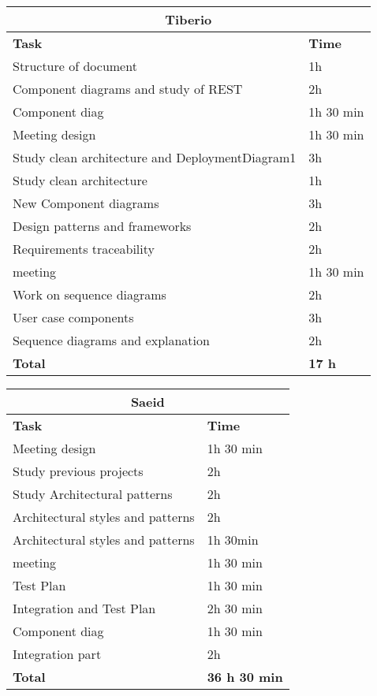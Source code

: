 \begin{table}[H]
\begin{tabular}{|l|l|}
\hline
\multicolumn{2}{|c|}{\textbf{Tiberio}}            \\ \hline
\textbf{Task}                   & \textbf{Time} \\ \hline
Structure of document                & 1h      \\ \hline
Component diagrams and study of REST       & 2h      \\ \hline
Component diag & 1h 30 min \\ \hline
Meeting design & 1h 30 min \\ \hline
Study clean architecture and DeploymentDiagram1 & 3h \\ \hline
Study clean architecture & 1h \\ \hline
New Component diagrams & 3h \\ \hline
Design patterns and frameworks & 2h \\ \hline
Requirements traceability & 2h \\ \hline
meeting & 1h 30 min \\ \hline
Work on sequence diagrams & 2h \\ \hline
User case components & 3h \\ \hline
Sequence diagrams and explanation & 2h \\ \hline

\rowcolor {polilight}
\textbf{Total}                  & \textbf{17 h}   \\ \hline
\end{tabular}
\end{table}


\begin{table}[H]
\begin{tabular}{|l|l|}
\hline
\multicolumn{2}{|c|}{\textbf{Saeid}}            \\ \hline
\textbf{Task}                   & \textbf{Time} \\ \hline
Meeting design & 1h 30 min \\ \hline
Study previous projects & 2h \\ \hline
Study Architectural  patterns & 2h \\ \hline
Architectural styles and patterns & 2h \\ \hline
Architectural styles and patterns & 1h 30min \\ \hline
meeting & 1h  30 min \\ \hline
Test Plan & 1h  30 min \\ \hline
Integration and Test Plan & 2h  30 min \\ \hline
Component diag & 1h  30 min \\ \hline
Integration part & 2h \\ \hline

\rowcolor {polilight}
\textbf{Total}                  & \textbf{36 h 30 min}   \\ \hline
\end{tabular}
\end{table}
